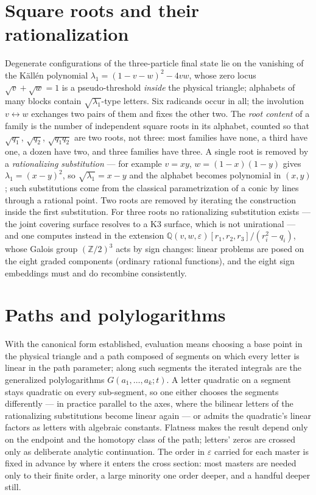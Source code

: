 \documentclass[11pt]{article}
\newcommand{\eps}{\varepsilon}
\newcommand{\Q}{\mathbb{Q}}
\newcommand{\Z}{\mathbb{Z}}
\begin{document}
\section{Square roots and their rationalization}
Degenerate configurations of the three-particle final state lie on
the vanishing of the K\"all\'en polynomial
$\lambda_1 = (1-v-w)^2 - 4vw$, whose zero locus
$\sqrt v + \sqrt w = 1$ is a pseudo-threshold \emph{inside} the
physical triangle; alphabets of many blocks contain
$\sqrt{\lambda_1}$-type letters.  Six radicands occur in all; the
involution $v \leftrightarrow w$ exchanges two pairs of them and
fixes the other two.  The \emph{root content} of a family is the
number of independent square roots in its alphabet, counted so that
$\sqrt{q_1}$, $\sqrt{q_2}$, $\sqrt{q_1 q_2}$ are two roots, not
three: most families have none, a third have one, a dozen have two,
and three families have three.  A single root is removed by a
\emph{rationalizing substitution} --- for example $v = xy$,
$w = (1-x)(1-y)$ gives $\lambda_1 = (x-y)^2$, so
$\sqrt{\lambda_1} = x - y$ and the alphabet becomes polynomial in
$(x,y)$; such substitutions come from the classical parametrization
of a conic by lines through a rational point.  Two roots are removed
by iterating the construction inside the first substitution.  For
three roots no rationalizing substitution exists --- the joint
covering surface resolves to a K3 surface, which is not unirational
--- and one computes instead in the extension
$\Q(v,w,\eps)[r_1,r_2,r_3]/(r_i^2 - q_i)$, whose Galois group
$(\Z/2)^3$ acts by sign changes: linear problems are posed on the
eight graded components (ordinary rational functions), and the
eight sign embeddings must and do recombine consistently.

\section{Paths and polylogarithms}
With the canonical form established, evaluation means choosing a
base point in the physical triangle and a path composed of segments
on which every letter is linear in the path parameter; along such
segments the iterated integrals are the generalized polylogarithms
$G(a_1,\dots,a_k;t)$.  A letter quadratic on a segment stays
quadratic on every sub-segment, so one either chooses the segments
differently --- in practice parallel to the axes, where the
bilinear letters of the rationalizing substitutions become linear
again --- or admits the quadratic's linear factors as letters with
algebraic constants.  Flatness makes the result depend only on the
endpoint and the homotopy class of the path; letters' zeros are
crossed only as deliberate analytic continuation.  The order in
$\eps$ carried for each master is fixed in advance by where it
enters the cross section: most masters are needed only to their
finite order, a large minority one order deeper, and a handful
deeper still.
\end{document}
